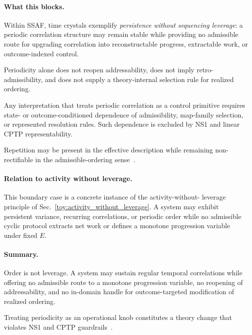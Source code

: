 \documentclass[aps,prx,onecolumn,11pt]{revtex4-2}
\theoremstyle{plain}
\theoremstyle{definition}
\theoremstyle{remark}
\begin{document}
\paragraph{What this blocks.}

Within SSAF, time crystals exemplify \emph{persistence without
sequencing leverage}: a periodic correlation structure may remain
stable while providing no admissible route for upgrading correlation
into reconstructable progress, extractable work, or outcome-indexed
control.

Periodicity alone does not reopen addressability, does not imply
retro-admissibility, and does not supply a theory-internal selection
rule for realized ordering.

Any interpretation that treats periodic correlation as a control
primitive requires state- or outcome-conditioned dependence of
admissibility, map-family selection, or represented resolution rules.
Such dependence is excluded by NS1 and linear CPTP representability.

Repetition may be present in the effective description while remaining
non-rectifiable in the admissible-ordering sense~\cite{WatanabeOshikawa2015,
ElseBauerNayak2016Floquet}.

\paragraph{Relation to activity without leverage.}

This boundary case is a concrete instance of the activity-without-
leverage principle of Sec.~\ref{toy:activity_without_leverage}.
A system may exhibit persistent variance, recurring correlations, or
periodic order while no admissible cyclic protocol extracts net work or
defines a monotone progression variable under fixed \(E\).

\paragraph{Summary.}

Order is not leverage. A system may sustain regular temporal
correlations while offering no admissible route to a monotone
progression variable, no reopening of addressability, and no in-domain
handle for outcome-targeted modification of realized ordering.

Treating periodicity as an operational knob constitutes a theory change
that violates NS1 and CPTP guardrails~\cite{WatanabeOshikawa2015,
ElseBauerNayak2016Floquet}.
\end{document}
